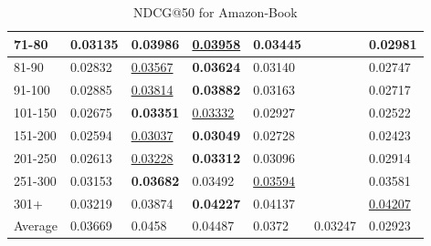 \begin{table*}[]
\begin{tabular}{|l|l|l|l|l|l|l|}
        71-80       & 0.03135                        & \textbf{0.03986}               & \underline{0.03958}            & 0.03445                        &                                & 0.02981                        \\ \hline
        81-90       & 0.02832                        & \underline{0.03567}            & \textbf{0.03624}               & 0.03140                        &                                & 0.02747                        \\ \hline
        91-100      & 0.02885                        & \underline{0.03814}            & \textbf{0.03882}               & 0.03163                        &                                & 0.02717                        \\ \hline
        101-150     & 0.02675                        & \textbf{0.03351}               & \underline{0.03332}            & 0.02927                        &                                & 0.02522                        \\ \hline
        151-200     & 0.02594                        & \underline{0.03037}            & \textbf{0.03049}               & 0.02728                        &                                & 0.02423                        \\ \hline
        201-250     & 0.02613                        & \underline{0.03228}            & \textbf{0.03312}               & 0.03096                        &                                & 0.02914                        \\ \hline
        251-300     & 0.03153                        & \textbf{0.03682}               & 0.03492                        & \underline{0.03594}            &                                & 0.03581                        \\ \hline
        301+        & 0.03219                        & 0.03874                        & \textbf{0.04227}               & 0.04137                        &                                & \underline{0.04207}            \\ \hline
        Average     & 0.03669                        & 0.0458                         & 0.04487                        & 0.0372                         & 0.03247                        & 0.02923                        \\ \hline
    \end{tabular}
    \caption{NDCG@50 for Amazon-Book}
    \label{tab:amazon-book-NDCG-evaluation}
\end{table*}

